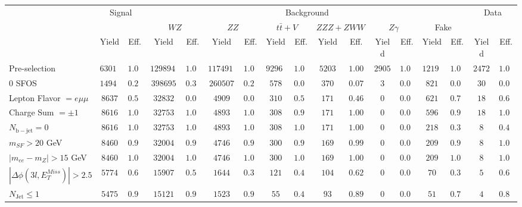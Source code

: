 \begin{tabular}{l||c|c||c|c||c|c||c|c||c|c||c|c||c|c||c|c}
\hline
 &                 \multicolumn{2}{c||}{Signal}            &  \multicolumn{12}{c||}{Background} &  \multicolumn{2}{c}{Data} \\
 & &  & \multicolumn{2}{c||}{$WZ$} & \multicolumn{2}{c||}{$ZZ$} & \multicolumn{2}{c||}{$t\bar{t}+V$} & \multicolumn{2}{c||}{$ZZZ+ZWW$} & \multicolumn{2}{c||}{$Z\gamma$} & \multicolumn{2}{c||}{Fake} &  & \\ 
 & Yield & Eff. & Yield & Eff. & Yield & Eff. & Yield & Eff. & Yield & Eff. & Yield & Eff. & Yield & Eff. & Yield & Eff.\\
\hline\hline
Pre-selection &  $63019$ &  $1.00$ &  $1298941$ &  $1.00$ &  $1174916$ &  $1.00$ &  $92968$ &  $1.00$ &  $5203$ &  $1.00$ &  $2905$ &  $1.00$ &  $12192$ &  $1.00$ &  $2472$ &  $1.00$\\ 
\hline
0 SFOS &  $14943$ &  $0.24$ &  $398695$ &  $0.31$ &  $260507$ &  $0.22$ &  $578$ &  $0.01$ &  $370$ &  $0.07$ &  $3$ &  $0.00$ &  $821$ &  $0.07$ &  $30$ &  $0.01$\\ 
\hline
Lepton Flavor $= e\mu\mu$ &  $8637$ &  $0.58$ &  $32832$ &  $0.08$ &  $4909$ &  $0.02$ &  $310$ &  $0.54$ &  $171$ &  $0.46$ &  $0$ &  $0.00$ &  $621$ &  $0.76$ &  $18$ &  $0.60$\\ 
\hline
Charge Sum $= \pm 1$ &  $8616$ &  $1.00$ &  $32753$ &  $1.00$ &  $4893$ &  $1.00$ &  $308$ &  $0.99$ &  $171$ &  $1.00$ &  $0$ &  $0.00$ &  $596$ &  $0.96$ &  $18$ &  $1.00$\\ 
\hline
$N_{\mathrm{b-jet}} = 0$ &  $8616$ &  $1.00$ &  $32753$ &  $1.00$ &  $4893$ &  $1.00$ &  $308$ &  $1.00$ &  $171$ &  $1.00$ &  $0$ &  $0.00$ &  $218$ &  $0.37$ &  $8$ &  $0.44$\\ 
\hline
$m_{SF} > 20$ GeV &  $8460$ &  $0.98$ &  $32004$ &  $0.98$ &  $4746$ &  $0.97$ &  $300$ &  $0.97$ &  $169$ &  $0.99$ &  $0$ &  $0.00$ &  $209$ &  $0.96$ &  $8$ &  $1.00$\\ 
\hline
$|m_{ee} - m_{Z}| > 15$ GeV &  $8460$ &  $1.00$ &  $32004$ &  $1.00$ &  $4746$ &  $1.00$ &  $300$ &  $1.00$ &  $169$ &  $1.00$ &  $0$ &  $0.00$ &  $209$ &  $1.00$ &  $8$ &  $1.00$\\ 
\hline
$|\Delta\phi(3l,E_{T}^{Miss})| > 2.5$ &  $5774$ &  $0.68$ &  $15907$ &  $0.50$ &  $1644$ &  $0.35$ &  $121$ &  $0.40$ &  $104$ &  $0.62$ &  $0$ &  $0.00$ &  $70$ &  $0.33$ &  $5$ &  $0.62$\\ 
\hline
$N_{\mathrm{Jet}} \leq 1$ &  $5475$ &  $0.95$ &  $15121$ &  $0.95$ &  $1523$ &  $0.93$ &  $55$ &  $0.45$ &  $93$ &  $0.89$ &  $0$ &  $0.00$ &  $51$ &  $0.73$ &  $4$ &  $0.80$\\ 
\hline
\end{tabular}
